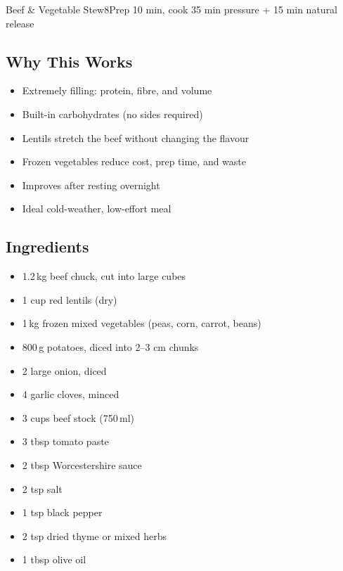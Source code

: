 \begin{recipebox}{Beef \& Vegetable Stew}{8}{Prep 10 min, cook 35 min pressure + 15 min natural release}
\subsection*{Why This Works}
\begin{itemize}
    \item Extremely filling: protein, fibre, and volume
    \item Built-in carbohydrates (no sides required)
    \item Lentils stretch the beef without changing the flavour
    \item Frozen vegetables reduce cost, prep time, and waste
    \item Improves after resting overnight
    \item Ideal cold-weather, low-effort meal
\end{itemize}

\subsection*{Ingredients}
\begin{itemize}
    \item 1.2\,kg beef chuck, cut into large cubes
    \item 1 cup red lentils (dry)
    \item 1\,kg frozen mixed vegetables (peas, corn, carrot, beans)
    \item 800\,g potatoes, diced into 2--3 cm chunks
    \item 2 large onion, diced
    \item 4 garlic cloves, minced
    \item 3 cups beef stock (750\,ml)
    \item 3 tbsp tomato paste
    \item 2 tbsp Worcestershire sauce
    \item 2 tsp salt
    \item 1 tsp black pepper
    \item 2 tsp dried thyme or mixed herbs
    \item 1 tbsp olive oil
\end{itemize}


\end{recipebox}
